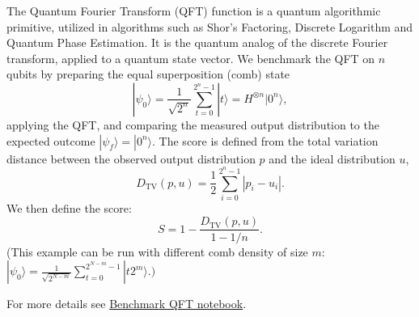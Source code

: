 The Quantum Fourier Transform (QFT) function is a quantum algorithmic primitive, utilized in algorithms such as Shor's Factoring, Discrete Logarithm and Quantum Phase Estimation. It is the quantum analog of the discrete Fourier transform, applied to a quantum state vector.
We benchmark the QFT on \(n\) qubits by preparing the equal superposition (comb) state
\[
|\psi_0\rangle = \frac{1}{\sqrt{2^n}} \sum_{t=0}^{2^n-1} |t\rangle = H^{\otimes n}|0^n\rangle ,
\]
applying the QFT, and comparing the measured output distribution to the expected outcome \(|\psi_f\rangle = |0^n\rangle\).
The score is defined from the total variation distance between the observed output distribution \(p\) and the ideal distribution \(u\),
\[
D_{\mathrm{TV}}(p,u) = \frac{1}{2}\sum_{i=0}^{2^n-1} |p_i - u_i| .
\]
We then define the score:
\[
S = 1 - \frac{D_{\mathrm{TV}}(p,u)}{1 - 1/n} .
\]
(This example can be run with different comb density of size $m$: $|\psi_0 \rangle = \frac{1}{\sqrt{2^{N-m}}}\sum_{t=0}^{2^{N-m}-1}|t 2^m\rangle.)$
\smallskip

For more details see \href{https://github.com/softqlib/softqlib-quantum-algorithms/tree/main/benchmarking/benchmarks/benchmark\_qft.ipynb}{Benchmark QFT notebook}.
\medskip
